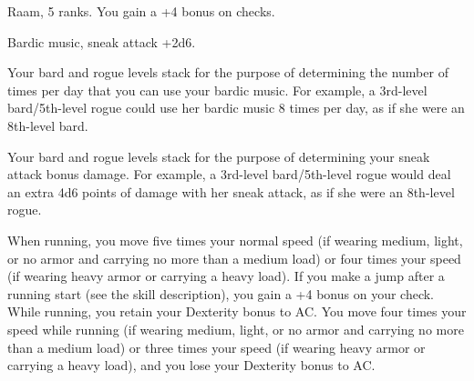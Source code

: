 {Raam,  5 ranks.}
{You gain a +4 bonus on  checks.}

{Bardic music, sneak attack +2d6.}
{
Your bard and rogue levels stack for the purpose of determining the number of times per day that you can use your bardic music. For example, a 3rd-level bard/5th-level rogue could use her bardic music 8 times per day, as if she were an 8th-level bard.

Your bard and rogue levels stack for the purpose of determining your sneak attack bonus damage. For example, a 3rd-level bard/5th-level rogue would deal an extra 4d6 points of damage with her sneak attack, as if she were an 8th-level rogue.
}

{}{}
{When running, you move five times your normal speed (if wearing medium, light, or no armor and carrying no more than a medium load) or four times your speed (if wearing heavy armor or carrying a heavy load). If you make a jump after a running start (see the  skill description), you gain a +4 bonus on your  check. While running, you retain your Dexterity bonus to AC.}
{You move four times your speed while running (if wearing medium, light, or no armor and carrying no more than a medium load) or three times your speed (if wearing heavy armor or carrying a heavy load), and you lose your Dexterity bonus to AC.}{}

